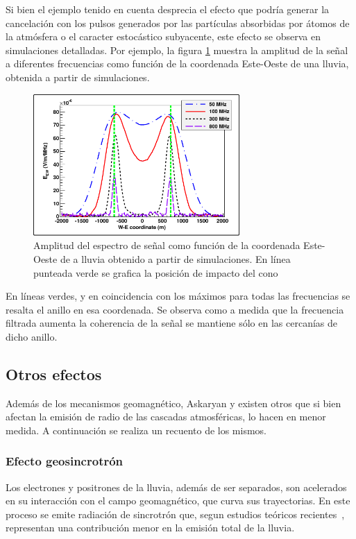 	Si bien el ejemplo tenido en cuenta desprecia el efecto que podr\'ia generar la cancelaci\'on con los pulsos generados por las part\'iculas absorbidas por \'atomos de la atm\'osfera o el caracter estoc\'astico subyacente, este efecto se observa en simulaciones detalladas.
	Por ejemplo, la figura \ref{fig:chConeSig} muestra la amplitud de la señal a diferentes frecuencias como función de la coordenada Este-Oeste de una lluvia, obtenida a partir de simulaciones.
	\begin{figure}[ht!]
	\centering
		\includegraphics[width=0.7\textwidth]{fig/EASRadio/chConeSig}
		\caption{\label{fig:chConeSig} Amplitud del espectro de se\~nal como funci\'on de la coordenada Este-Oeste de a lluvia obtenido a partir de simulaciones. En l\'inea punteada verde se grafica la posici\'on de impacto del cono \cher{}}
	\end{figure}
	En l\'ineas verdes, y en coincidencia con los máximos para todas las frecuencias se resalta el anillo \cher{} en esa coordenada.
	Se observa como a medida que la frecuencia filtrada aumenta la coherencia de la se\~nal se mantiene sólo en las cercan\'ias de dicho anillo.
	
\subsection{Otros efectos}
\label{sbsc:other_emision}
	
	Adem\'as de los mecanismos geomagn\'etico, Askaryan y \cher{} existen otros que si bien afectan la emisi\'on de radio de las cascadas atmosf\'ericas, lo hacen en menor medida. 
	A continuaci\'on se realiza un recuento de los mismos.
	
	\subsubsection{Efecto geosincrotr\'on}
	Los electrones y positrones de la lluvia, adem\'as de ser separados, son acelerados en su interacci\'on con el campo geomagn\'etico, que curva sus trayectorias.
	En este proceso se emite radiaci\'on de sincrotr\'on que, segun estudios te\'oricos recientes~\cite{geosintrotron}, representan una contribuci\'on menor en la emisi\'on total de la lluvia.
	
